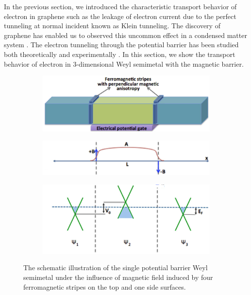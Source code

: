     In the previous section, we introduced the characteristic transport behavior of electron in graphene such as the leakage of electron current due to the perfect tunneling at normal incident known as Klein tunneling.
    The discovery of graphene has enabled us to observed this uncommon effect in a condensed matter system \cite{Zhang2004}.
    The electron tunneling through the potential barrier has been studied both theoretically and experimentally \cite{Katsnelson2006a,Allain2011,Rahman2015}.
    In this section, we show the transport behavior of electron in 3-dimensional Weyl semimetal with the magnetic barrier.
    \begin{figure}[H]
        \centering
        \begin{subfigure}[b]{0.6\linewidth}
            \includegraphics[width = \linewidth]{fig/Chap 2/2weyl structure.png}
            \caption{}
            \label{2fig:weyl structure}
        \end{subfigure}
        \begin{subfigure}[b]{0.6\linewidth}
            \includegraphics[width = \linewidth]{fig/Chap 2/B field profile.png}
            \caption{}
            \label{2fig:b field profile}
        \end{subfigure}
        \begin{subfigure}[b]{0.6\linewidth}
            \includegraphics[width = \linewidth]{fig/Chap 2/three weyl cones.png}
            \caption{}
            \label{2fig:3 weyl cones}
        \end{subfigure}
        \caption{The schematic illustration of the single potential barrier Weyl semimetal under the influence of magnetic field 
                    induced by four ferromagnetic stripes on the top and one side surfaces.}
        \label{2fig:weyl npn}
    \end{figure}
